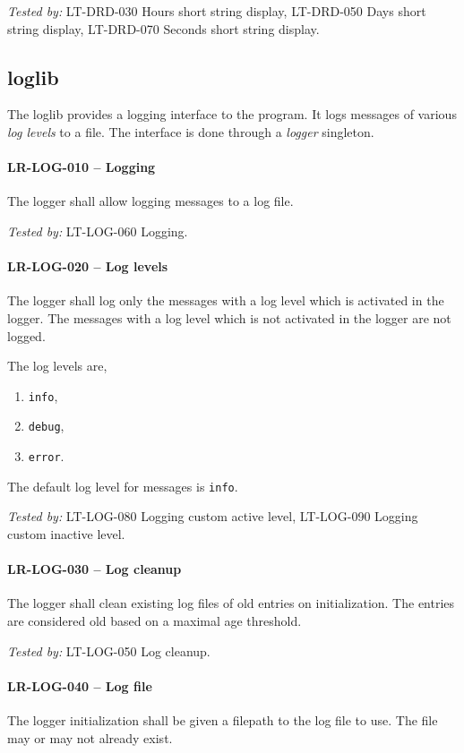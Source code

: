 \textit{Tested by: } LT-DRD-030 Hours short string display,
LT-DRD-050 Days short string display,
LT-DRD-070 Seconds short string display.

\subsection{log\textunderscore lib}
The log\textunderscore lib provides a logging interface to the program.
It logs messages of various \emph{log levels} to a file. The interface
is done through a \emph{logger} singleton.

\paragraph{LR-LOG-010 -- Logging}
The logger shall allow logging messages to a log file.

\textit{Tested by: } LT-LOG-060 Logging.

\paragraph{LR-LOG-020 -- Log levels}
The logger shall log only the messages with a log level which is
activated in the logger. The messages with a log level which is
not activated in the logger are not logged.

The log levels are,
\begin{enumerate}
\item \lstinline{info},
\item \lstinline{debug},
\item \lstinline{error}.
\end{enumerate}

The default log level for messages is \lstinline{info}.

\textit{Tested by: } LT-LOG-080 Logging custom active level,
LT-LOG-090 Logging custom inactive level.

\paragraph{LR-LOG-030 -- Log cleanup}
The logger shall clean existing log files of old entries on initialization.
The entries are considered old based on a maximal age threshold.

\textit{Tested by: } LT-LOG-050 Log cleanup.

\paragraph{LR-LOG-040 -- Log file}
The logger initialization shall be given a filepath to the log file
to use. The file may or may not already exist.


